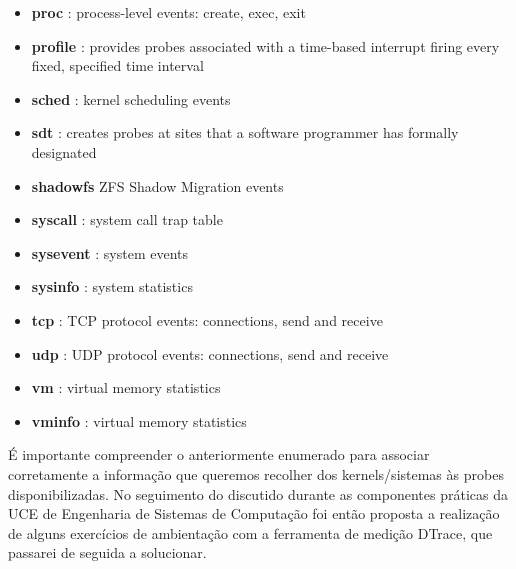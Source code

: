 \documentclass[a4paper]{article}
\begin{document}
{\begin{itemize}
\item \textbf{proc} : process-level events: create, exec, exit
\item \textbf{profile} : provides probes associated with a time-based interrupt firing every fixed, specified time interval
\item \textbf{sched} : kernel scheduling events
\item \textbf{sdt} : creates probes at sites that a software programmer has formally designated
\item \textbf{shadowfs} ZFS Shadow Migration events
\item \textbf{syscall} : system call trap table
\item \textbf{sysevent} : system events
\item \textbf{sysinfo} : system statistics
\item \textbf{tcp} : TCP protocol events: connections, send and receive
\item \textbf{udp} : UDP protocol events: connections, send and receive
\item \textbf{vm} : virtual memory statistics
\item \textbf{vminfo} : virtual memory statistics
\end{itemize}


É importante compreender o anteriormente enumerado para associar corretamente a informação que queremos recolher dos kernels/sistemas às probes disponibilizadas. No seguimento do discutido durante as componentes práticas da UCE de Engenharia de Sistemas de Computação foi então proposta a realização de alguns exercícios de ambientação com a ferramenta de medição DTrace, que passarei de seguida a solucionar. 
}

\newpage
\section{}
\end{document}
